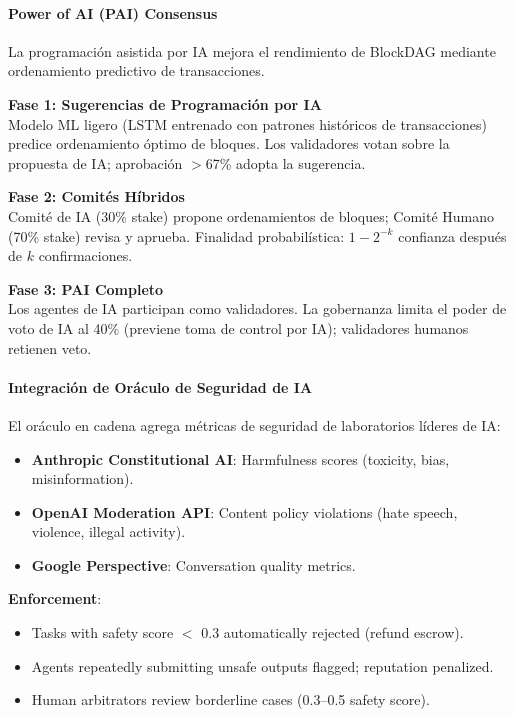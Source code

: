 \documentclass[11pt]{article}
\begin{document}
\paragraph{Power of AI (PAI) Consensus}
La programación asistida por IA mejora el rendimiento de BlockDAG mediante ordenamiento predictivo de transacciones.

\textbf{Fase 1: Sugerencias de Programación por IA}\\
Modelo ML ligero (LSTM entrenado con patrones históricos de transacciones) predice ordenamiento óptimo de bloques. Los validadores votan sobre la propuesta de IA; aprobación $>$67\% adopta la sugerencia.

\textbf{Fase 2: Comités Híbridos}\\
Comité de IA (30\% stake) propone ordenamientos de bloques; Comité Humano (70\% stake) revisa y aprueba. Finalidad probabilística: $1 - 2^{-k}$ confianza después de $k$ confirmaciones.

\textbf{Fase 3: PAI Completo}\\
Los agentes de IA participan como validadores. La gobernanza limita el poder de voto de IA al 40\% (previene toma de control por IA); validadores humanos retienen veto.

\paragraph{Integración de Oráculo de Seguridad de IA}
El oráculo en cadena agrega métricas de seguridad de laboratorios líderes de IA:
\begin{itemize}[noitemsep]
  \item \textbf{Anthropic Constitutional AI}: Harmfulness scores (toxicity, bias, misinformation).
  \item \textbf{OpenAI Moderation API}: Content policy violations (hate speech, violence, illegal activity).
  \item \textbf{Google Perspective}: Conversation quality metrics.
\end{itemize}

\textbf{Enforcement}:
\begin{itemize}[noitemsep]
  \item Tasks with safety score $<$ 0.3 automatically rejected (refund escrow).
  \item Agents repeatedly submitting unsafe outputs flagged; reputation penalized.
  \item Human arbitrators review borderline cases (0.3--0.5 safety score).
\end{itemize}
\end{document}
